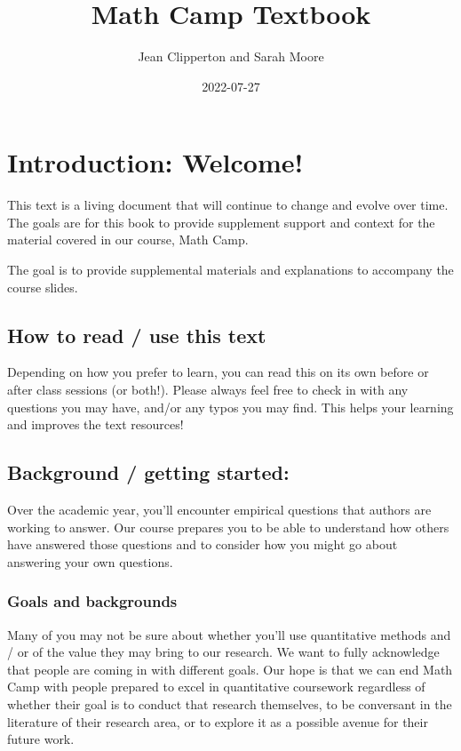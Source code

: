 \documentclass[
]{book}
\title{Math Camp Textbook}
\author{Jean Clipperton and Sarah Moore}
\date{2022-07-27}
\begin{document}
\maketitle

{
\setcounter{tocdepth}{1}
\tableofcontents
}
\hypertarget{introduction-welcome}{%
\chapter{Introduction: Welcome!}\label{introduction-welcome}}

This text is a living document that will continue to change and evolve over time. The goals are for this book to provide supplement support and context for the material covered in our course, Math Camp.

The goal is to provide supplemental materials and explanations to accompany the course slides.

\hypertarget{how-to-read-use-this-text}{%
\section{How to read / use this text}\label{how-to-read-use-this-text}}

Depending on how you prefer to learn, you can read this on its own before or after class sessions (or both!). Please always feel free to check in with any questions you may have, and/or any typos you may find. This helps your learning and improves the text resources!

\hypertarget{background-getting-started}{%
\section{Background / getting started:}\label{background-getting-started}}

Over the academic year, you'll encounter empirical questions that authors are working to answer. Our course prepares you to be able to understand how others have answered those questions and to consider how you might go about answering your own questions.

\hypertarget{goals-and-backgrounds}{%
\subsection{Goals and backgrounds}\label{goals-and-backgrounds}}

Many of you may not be sure about whether you'll use quantitative methods and / or of the value they may bring to our research. We want to fully acknowledge that people are coming in with different goals. Our hope is that we can end Math Camp with people prepared to excel in quantitative coursework regardless of whether their goal is to conduct that research themselves, to be conversant in the literature of their research area, or to explore it as a possible avenue for their future work.
\end{document}
